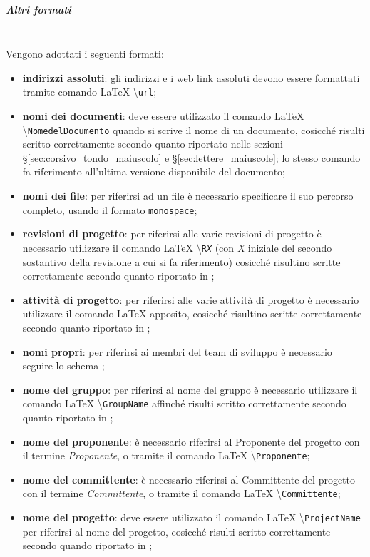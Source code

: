 \subparagraph{Altri formati} \mbox{} \\
Vengono adottati i seguenti formati:
\begin{itemize}
	\item \textbf{indirizzi assoluti}: gli indirizzi \email{} e i web link assoluti devono essere formattati tramite comando \LaTeX{} \textbackslash{\texttt{url}};
	\item \textbf{nomi dei documenti}: deve essere utilizzato il comando \LaTeX{} \textbackslash{\texttt{NomedelDocumento}} quando si scrive il nome di un documento, cosicché risulti scritto correttamente secondo quanto riportato nelle sezioni §\ref{sec:corsivo_tondo_maiuscolo} e §\ref{sec:lettere_maiuscole}; lo stesso comando fa riferimento all'ultima versione disponibile del documento;
	\item \textbf{nomi dei file}: per riferirsi ad un file è necessario specificare il suo percorso completo, usando il formato \texttt{monospace};
	\item \textbf{revisioni di progetto}: per riferirsi alle varie revisioni di progetto è necessario utilizzare il comando \LaTeX{} \textbackslash{\texttt{R\textit{X}}} (con \textit{X} iniziale del secondo sostantivo della revisione a cui si fa riferimento) cosicché risultino scritte correttamente secondo quanto riportato in ;
	\item \textbf{attività di progetto}: per riferirsi alle varie attività di progetto è necessario utilizzare il comando \LaTeX{} apposito, cosicché risultino scritte correttamente secondo quanto riportato in ;
	\item \textbf{nomi propri}: per riferirsi ai membri del team di sviluppo è necessario seguire lo schema ;
	\item \textbf{nome del gruppo}: per riferirsi al nome del gruppo è necessario utilizzare il comando \LaTeX{} \textbackslash{\texttt{GroupName}} affinché risulti scritto correttamente secondo quanto riportato in ;
	\item \textbf{nome del proponente}: è necessario riferirsi al Proponente del progetto con il termine \textit{Proponente}, o tramite il comando \LaTeX{} \textbackslash{\texttt{Proponente}};
	\item \textbf{nome del committente}: è necessario riferirsi al Committente del progetto con il termine \textit{Committente}, o tramite il comando \LaTeX{} \textbackslash{\texttt{Committente}};
	\item \textbf{nome del progetto}: deve essere utilizzato il comando \LaTeX{} \textbackslash{\texttt{ProjectName}} per riferirsi al nome del progetto, cosicché risulti scritto correttamente secondo quando riportato in ;
\end{itemize}

